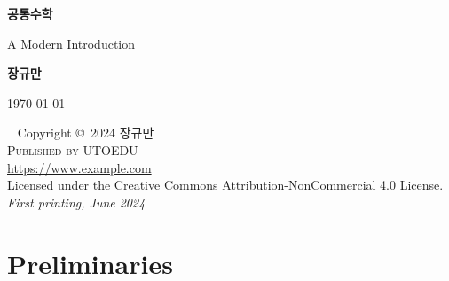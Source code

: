 \documentclass[
    11pt,
    fleqn,
    a4paper
]{mathbook}
\begin{document}


\begin{titlepage}
    \centering
    {\Huge\bfseries 공통수학\par}
    \vspace{16pt}
    {\LARGE A Modern Introduction\par}
    \vspace{24pt}
    {\huge\bfseries 장규만\par}
    \vfill
    {\large \today\par}
\end{titlepage}


\thispagestyle{empty}
~\vfill
\noindent Copyright \copyright\ 2024 장규만\\
\noindent \textsc{Published by UTOEDU}\\
\noindent \url{https://www.example.com}\\
\noindent Licensed under the Creative Commons Attribution-NonCommercial 4.0 License.\\
\noindent \textit{First printing, June 2024}


\pagestyle{empty}
\tableofcontents
\listoffigures
\listoftables
\pagestyle{fancy}
\cleardoublepage


\part{Preliminaries}
\end{document}
